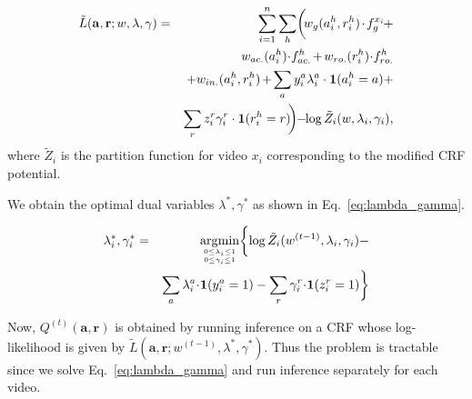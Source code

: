 \documentclass[10pt,twocolumn,letterpaper]{article}
\DeclareMathOperator*{\argmin}{\arg\!\min}
\begin{document}
{\small 
\begin{eqnarray} \label{eq:modified_PR}
  \tilde{L}(\mathbf{a}, \mathbf{r};w, \lambda, \gamma) & = & \sum \limits_{i=1}^{n} \sum \limits_{h} \biggl( \hspace*{-2pt} w_g(a_i^h, r_i^h) \hspace*{-1pt} \cdot  \hspace*{-1pt} f_g^{x_i} \hspace*{-1pt}  +   \\ \nonumber
  && w_{ac.}(a_i^h) \hspace*{-2pt} \cdot \hspace*{-2pt} f_{ac.}^{h} \hspace*{-1pt} +  \hspace*{-1pt} w_{ro.}(r_i^h) \hspace*{-2pt} \cdot \hspace*{-2pt} f_{ro.}^{h} \\ \nonumber
  && + w_{in.}(a_i^h, r_i^h) \hspace*{-1pt}  + \hspace*{-1pt} \sum_{a}  y_i^a \lambda_i^a \cdot \mathbf{1}(a_i^h = a) + \\ \nonumber
&&  \sum_{r} z_i^r \gamma_i^r \cdot \mathbf{1}(r_i^h = r) \hspace*{-2pt} \biggr) \hspace*{-3pt} - \hspace*{-3pt} \log \tilde{Z}_i(w, \lambda_i, \gamma_i), \nonumber
\end{eqnarray}}where $\tilde{Z}_i$ is the partition function for video $x_i$ corresponding to the modified CRF potential.

We obtain the optimal dual variables $\lambda^*, \gamma^*$ as shown in Eq.~\ref{eq:lambda_gamma}.

{\small
\begin{eqnarray} \label{eq:lambda_gamma}
 \lambda_i^*, \gamma_i^* &=& \argmin \limits_{0 \leq \lambda_i \leq 1 \atop 0 \leq \gamma_i \leq 1} \biggl\{ \log \tilde{Z}_i(w^{(t-1)}, \lambda_i, \gamma_i) -  \\ \nonumber
 && \sum \limits_a \lambda_i^a \hspace*{-2pt} \cdot \hspace*{-2pt} \mathbf{1}(y_i^a = 1) - \sum \limits_r \gamma_i^r \hspace*{-2pt} \cdot \hspace*{-2pt} \mathbf{1}(z_i^r = 1) \biggr\}
\end{eqnarray}
}

Now, $Q^{(t)}(\mathbf{a}, \mathbf{r})$ is obtained by running inference on a CRF whose log-likelihood is given by $\tilde{L}(\mathbf{a}, \mathbf{r}; w^{(t-1)}, \lambda^*, \gamma^*)$. Thus the problem is tractable since we solve Eq.~\ref{eq:lambda_gamma} and run inference separately for each video.
\end{document}
